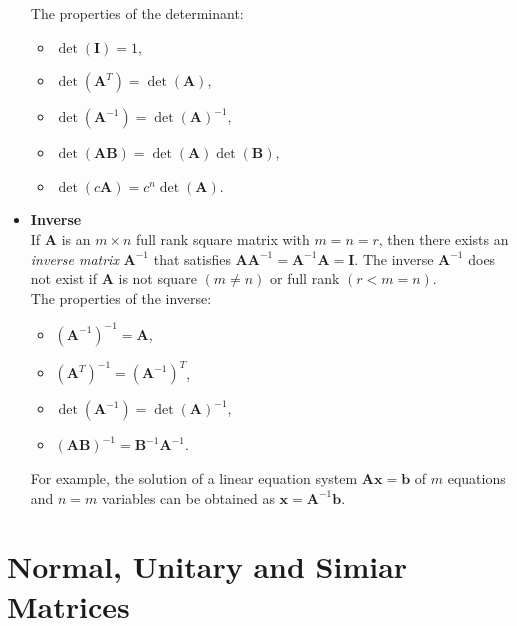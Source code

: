 \documentclass[10pt,b5paper,titlepage]{book}
\begin{document}
\begin{itemize}
        The properties of the determinant:

        \begin{itemize}
            \item $\det(\mathbf{I}) = 1$,
            \item $\det(\mathbf{A}^{T}) = \det(\mathbf{A})$,
            \item $\det(\mathbf{A}^{-1}) = \det(\mathbf{A})^{-1}$,
            \item $\det(\mathbf{A}\mathbf{B}) = \det(\mathbf{A})\det(\mathbf{B})$,
            \item $\det(c\mathbf{A}) = c^{n} \det(\mathbf{A})$.
        \end{itemize}

    \item \textbf{Inverse}\\

        If $\mathbf{A}$ is an $m \times n$ full rank square matrix with $m = n = r$,
        then there exists an  \textit{inverse matrix} $\mathbf{A}^{-1}$ that
        satisfies $\mathbf{A}\mathbf{A}^{-1} = \mathbf{A}^{-1}\mathbf{A} = \mathbf{I}$.
        The inverse $\mathbf{A}^{-1}$ does not exist if $\mathbf{A}$ is not
        square $(m \neq n)$ or full rank $(r < m = n)$.\\

        The properties of the inverse:

        \begin{itemize}
            \item $(\mathbf{A}^{-1})^{-1} = \mathbf{A}$,
            \item $(\mathbf{A}^{T})^{-1} = (\mathbf{A}^{-1})^{T}$,
            \item $\det(\mathbf{A}^{-1}) = \det(\mathbf{A})^{-1}$,
            \item $(\mathbf{A}\mathbf{B})^{-1} = \mathbf{B}^{-1}\mathbf{A}^{-1}$.
        \end{itemize}

        For example, the solution of a linear equation system
        $\mathbf{A}\mathbf{x} = \mathbf{b}$ of $m$ equations and $n = m$ variables
        can be obtained as $\mathbf{x} = \mathbf{A}^{-1}\mathbf{b}$.
\end{itemize}



\chapter{Normal, Unitary and Simiar Matrices}
\end{document}
